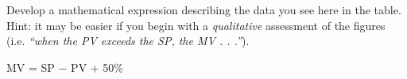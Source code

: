Develop a mathematical expression describing the data you see here in the table.  Hint: it may be easier if you begin with a {\it qualitative} assessment of the figures (i.e. {\it ``when the PV exceeds the SP, the MV . . .''}).







MV = SP $-$ PV + 50\%











